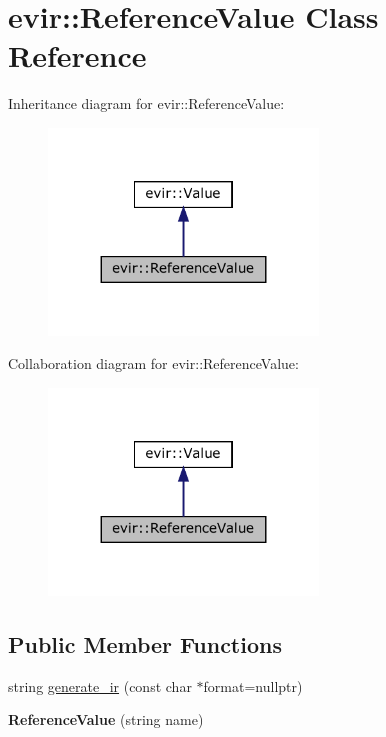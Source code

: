 \hypertarget{classevir_1_1ReferenceValue}{}\section{evir\+:\+:Reference\+Value Class Reference}
\label{classevir_1_1ReferenceValue}


Inheritance diagram for evir\+:\+:Reference\+Value\+:
\nopagebreak
\begin{figure}[H]
\begin{center}
\leavevmode
\includegraphics[width=203pt]{classevir_1_1ReferenceValue__inherit__graph}
\end{center}
\end{figure}


Collaboration diagram for evir\+:\+:Reference\+Value\+:
\nopagebreak
\begin{figure}[H]
\begin{center}
\leavevmode
\includegraphics[width=203pt]{classevir_1_1ReferenceValue__coll__graph}
\end{center}
\end{figure}
\subsection*{Public Member Functions}
\begin{DoxyCompactItemize}
\item 
string \hyperlink{classevir_1_1ReferenceValue_ad669613befab66578629de2ccfb8c2c3}{generate\+\_\+ir} (const char $\ast$format=nullptr)
\item 
\mbox{\label{classevir_1_1ReferenceValue_a9f20a5682fe940f5ca31cbc48ff17c84}} 
{\bfseries Reference\+Value} (string name)
\end{DoxyCompactItemize}
